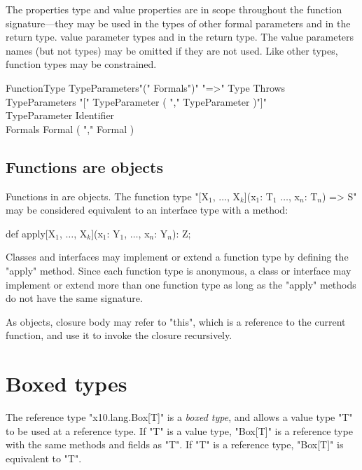 The
\iftypeparams
properties
\else
type and value properties
\fi
are in scope throughout the function signature---they may be
used
in the types of other formal parameters and in the return type.
value parameter types and in the return type.
The value parameters names (but not types) may be omitted if
they are not used. 
Like other types, function types may be constrained.

\begin{grammar}
FunctionType \: TypeParameters\opt \xcd"(" Formals\opt \xcd")"
\xcd"=>" Type Throws\opt \\
TypeParameters \: \xcd"[" TypeParameter ( \xcd"," TypeParameter
)\star \xcd"]" \\
TypeParameter \: Identifier \\
Formals \: Formal ( \xcd"," Formal )\star \\
\end{grammar}

\subsection{Functions are objects}
\label{FunctionsAreObjects}

Functions in \Xten{} are objects.  
The function type
\xcdmath"[X$_1$, $\dots$, X$_k$](x$_1$: T$_1$ $\dots$, x$_n$: T$_n$) => S"
may be considered equivalent to an interface type
with a method:
\begin{xtenmath}
def apply[X$_1$, $\dots$, X$_k$](x$_1$: Y$_1$, $\dots$, x$_n$: Y$_n$): Z;
\end{xtenmath}
Classes and interfaces may implement or extend a function type
by defining the \xcd"apply" method.  Since each function type is 
anonymous, a class or interface may implement or extend
more than one function type as long as the \xcd"apply" methods
do not have the same signature.

As objects, closure body may refer to
\xcd"this", which is a reference to the current function,
and use it to invoke the closure recursively.

\section{Boxed types}
\label{BoxedTypes}
\label{BoxType}


The reference type \xcd"x10.lang.Box[T]" is a \emph{boxed type},
and allows a value type \xcd"T" to be used at a
reference type.
%
If \xcd"T" is a value type, \xcd"Box[T]" is a reference type
with the same methods and fields as \xcd"T".
If \xcd"T" is a reference type, \xcd"Box[T]" is equivalent to
\xcd"T".

